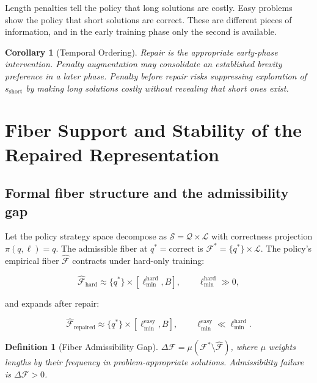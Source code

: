 \documentclass[11pt]{article}
\theoremstyle{rthm}
\newtheorem{corollary}[theorem]{Corollary}
\theoremstyle{rdef}
\newtheorem{definition}[theorem]{Definition}
\theoremstyle{remark}
\begin{document}
Length penalties tell the policy that long solutions are costly.
Easy problems show the policy that short solutions are correct.
These are different pieces of information, and in the early training
phase only the second is available.

\begin{corollary}[Temporal Ordering]
\label{cor:temporal}
Repair is the appropriate early-phase intervention. Penalty
augmentation may consolidate an established brevity preference
in a later phase. Penalty before repair risks suppressing
exploration of $s_{\mathrm{short}}$ by making long solutions
costly without revealing that short ones exist.
\end{corollary}

\section{Fiber Support and Stability of the Repaired Representation}
\label{sec:topology}

\subsection{Formal fiber structure and the admissibility gap}

Let the policy strategy space decompose as
$\mathcal{S} = \mathcal{Q} \times \mathcal{L}$ with correctness
projection $\pi(q,\ell) = q$. The admissible fiber at $q^* =
\mathrm{correct}$ is $\mathcal{F}^* = \{q^*\} \times \mathcal{L}$.
The policy's empirical fiber $\hat{\mathcal{F}}$ contracts under
hard-only training:

\[
\hat{\mathcal{F}}_{\mathrm{hard}} \approx
\{q^*\} \times [\ell_{\min}^{\mathrm{hard}}, B],
\qquad \ell_{\min}^{\mathrm{hard}} \gg 0,
\]

and expands after repair:

\[
\hat{\mathcal{F}}_{\mathrm{repaired}} \approx
\{q^*\} \times [\ell_{\min}^{\mathrm{easy}}, B],
\qquad \ell_{\min}^{\mathrm{easy}} \ll \ell_{\min}^{\mathrm{hard}}.
\]

\begin{definition}[Fiber Admissibility Gap]
$\Delta\mathcal{F} = \mu(\mathcal{F}^* \setminus \hat{\mathcal{F}})$,
where $\mu$ weights lengths by their frequency in problem-appropriate
solutions. Admissibility failure is $\Delta\mathcal{F} > 0$.
\end{definition}
\end{document}
